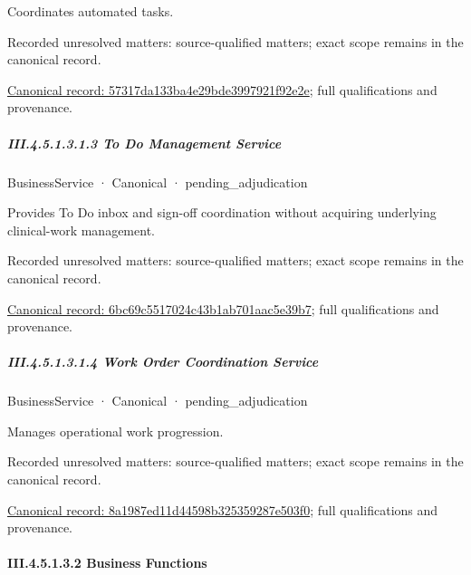 Coordinates automated tasks.


{\small Recorded unresolved matters: source-qualified matters; exact scope remains in the canonical record.}\par
{\footnotesize \href{../../../../../../../continuum/business/business-service/57317da133ba4e29bde3997921f92e2e.md}{Canonical record: 57317da133ba4e29bde3997921f92e2e}; full qualifications and provenance.}\par
\subparagraph*{III.4.5.1.3.1.3 To Do Management Service}
\label{navigation:III.4.5.1.3.1.3}

\label{element:6bc69c5517024c43b1ab701aac5e39b7}
{\small BusinessService · Canonical · pending\_adjudication}\par

Provides To Do inbox and sign-off coordination without acquiring underlying clinical-work management.


{\small Recorded unresolved matters: source-qualified matters; exact scope remains in the canonical record.}\par
{\footnotesize \href{../../../../../../../continuum/business/business-service/6bc69c5517024c43b1ab701aac5e39b7.md}{Canonical record: 6bc69c5517024c43b1ab701aac5e39b7}; full qualifications and provenance.}\par
\subparagraph*{III.4.5.1.3.1.4 Work Order Coordination Service}
\label{navigation:III.4.5.1.3.1.4}

\label{element:8a1987ed11d44598b325359287e503f0}
{\small BusinessService · Canonical · pending\_adjudication}\par

Manages operational work progression.


{\small Recorded unresolved matters: source-qualified matters; exact scope remains in the canonical record.}\par
{\footnotesize \href{../../../../../../../continuum/business/business-service/8a1987ed11d44598b325359287e503f0.md}{Canonical record: 8a1987ed11d44598b325359287e503f0}; full qualifications and provenance.}\par
\paragraph*{III.4.5.1.3.2 Business Functions}
\label{navigation:III.4.5.1.3.2}

